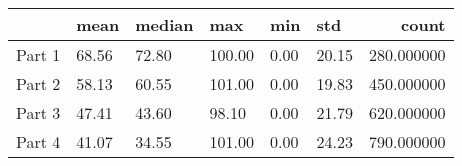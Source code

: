 \begin{tabular}{llllllr}
\toprule
 & mean & median & max & min & std & count \\
\midrule
Part 1 & 68.56 & 72.80 & 100.00 & 0.00 & 20.15 & 280.000000 \\
Part 2 & 58.13 & 60.55 & 101.00 & 0.00 & 19.83 & 450.000000 \\
Part 3 & 47.41 & 43.60 & 98.10 & 0.00 & 21.79 & 620.000000 \\
Part 4 & 41.07 & 34.55 & 101.00 & 0.00 & 24.23 & 790.000000 \\
\bottomrule
\end{tabular}
